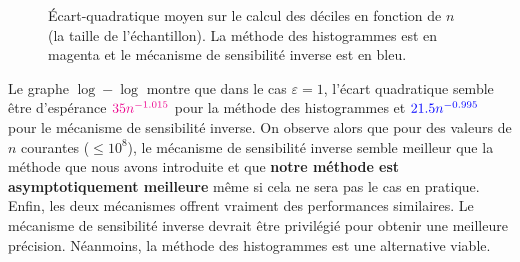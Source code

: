 \begin{figure}[H]
    \centering
    \hfill
    \hfill
    \caption{Écart-quadratique moyen sur le calcul des déciles en fonction de \(n\) (la taille de l'échantillon). La méthode des histogrammes est en {\color{magenta} magenta} et le mécanisme de sensibilité inverse est en {\color{blue} bleu}.}
\end{figure}

Le graphe \(\log-\log\) montre que dans le cas \(\varepsilon = 1\), l'écart quadratique semble être d’espérance \(\color{magenta} 35n^{-1.015}\) pour la méthode des histogrammes et \(\color{blue} 21.5n^{-0.995}\) pour le mécanisme de sensibilité inverse. On observe alors que pour des valeurs de \(n\) courantes (\(\leq 10^8\)), le mécanisme de sensibilité inverse semble meilleur que la méthode que nous avons introduite et que \textbf{notre méthode est asymptotiquement meilleure} même si cela ne sera pas le cas en pratique.\\

Enfin, les deux mécanismes offrent vraiment des performances similaires. Le mécanisme de sensibilité inverse devrait être privilégié pour obtenir une meilleure précision. Néanmoins, la méthode des histogrammes est une alternative viable.

